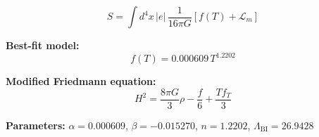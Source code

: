 
\begin{equation}
  S = \int d^4x \, |e| \, \frac{1}{16\pi G} \left[ f(T) + \mathcal{L}_m \right]
\end{equation}

\textbf{Best-fit model:}
\begin{equation}
  f(T) = 0.000609 \, T^{1.2202}
\end{equation}

\textbf{Modified Friedmann equation:}
\begin{equation}
  H^2 = \frac{8\pi G}{3} \rho - \frac{f}{6} + \frac{T f_T}{3}
\end{equation}

\textbf{Parameters:}
$\alpha = 0.000609$, \quad
$\beta = -0.015270$, \quad
$n = 1.2202$, \quad
$\Lambda_{\text{BI}} = 26.9428$